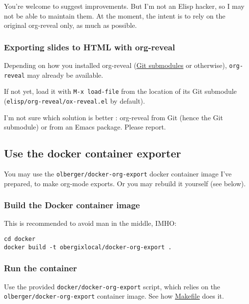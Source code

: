 \documentclass[a4paper]{article}
\newenvironment{NOTES}{\begin{lrbox}{\mybox}\begin{minipage}{0.9\textwidth}\begin{shaded}}{\end{shaded}\end{minipage}\end{lrbox}\fbox{\usebox{\mybox}}}
\begin{document}
\begin{NOTES}
You're welcome to suggest improvements. But I'm not an Elisp hacker,
so I may not be able to maintain them. At the moment, the intent is to
rely on the original org-reveal only, as much as possible.
\end{NOTES}

\subsubsection{Exporting slides to HTML with org-reveal}
\label{sec:org56689a1}

Depending on how you installed org-reveal (\hyperref[sec:org9b5ee48]{Git submodules} or otherwise), \texttt{org-reveal} may already be available.

If not yet, load it with \texttt{M-x load-file} from the location of its Git submodule (\texttt{elisp/org-reveal/ox-reveal.el} by default).

\begin{NOTES}
I'm not sure which solution is better : org-reveal from Git (hence the Git submodule) or from an Emacs package. Please report.
\end{NOTES}

\subsection{Use the docker container exporter}
\label{sec:orgd526df5}

You may use the \texttt{olberger/docker-org-export} docker container image
I've prepared, to make org-mode exports. Or you may rebuild it
yourself (see below).

\subsubsection{Build the Docker container image}
\label{sec:orgd105d4d}

This is recommended to avoid man in the middle, IMHO:

\begin{verbatim}
cd docker
docker build -t obergixlocal/docker-org-export .
\end{verbatim}

\subsubsection{Run the container}
\label{sec:org26864d8}

Use the provided \texttt{docker/docker-org-export} script, which relies on
the \texttt{olberger/docker-org-export} container image. See how \url{Makefile} does it.
\end{document}

